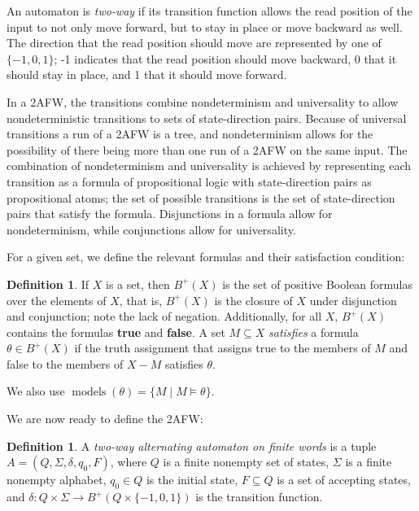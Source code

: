 \documentclass{lmcs}
\theoremstyle{definition}
\newtheorem{definition}[thm]{Definition}
\DeclareMathOperator{\?}{?}
\DeclareMathOperator{\mymodels}{models}
\begin{document}
An automaton is \textit{two-way} if its transition function allows the read position of the
input to not only move forward, but to stay in place or move backward as well. The direction
that the read position should move are represented by one of $\{-1,0,1\}$; -1 indicates
that the read position should move backward, 0 that it should stay in place, and 1 that it
should move forward.

In a 2AFW, the transitions combine nondeterminism and universality to allow nondeterministic
transitions to sets of state-direction pairs. Because of universal transitions a run of a 2AFW
is a tree, and nondeterminism allows for the possibility of there being more than one run of
a 2AFW on the same input. The combination of nondeterminism and universality is achieved by
representing each transition as a formula of propositional logic with state-direction pairs
as propositional atoms; the set of possible transitions is the set of state-direction pairs that
satisfy the formula. Disjunctions in a formula allow for nondeterminism, while conjunctions
allow for universality.



For a given set, we define the relevant formulas and their satisfaction condition:

    \begin{definition}\label{def:positive_boolean}
If $X$ is a set, then $B^+(X)$ is the set of positive Boolean formulas over the elements of
    $X$, that is, $B^+(X)$ is the closure of $X$ under disjunction and conjunction; note
    the lack of negation. Additionally, for all $X$, $B^+(X)$ contains the formulas
    \textbf{true} and \textbf{false}.  A set
$M \subseteq X$ \textit{satisfies} a formula $\theta \in B^+(X)$ if the truth
assignment that assigns true to the members of $M$ and false to the members of
$X - M$ satisfies $\theta$.
\end{definition}
We also use $\mymodels(\theta) = \{M \mid M \models \theta \}$.

We are now ready to define the 2AFW:

    \begin{definition}\label{def:2afw_simple}
A \textit{two-way alternating automaton on finite words} is a tuple $A = (Q, \Sigma, \delta, \allowbreak q_0,
F)$, where $Q$ is a finite nonempty set of states, $\Sigma$ is a finite nonempty alphabet, $q_0
\in Q$ is the initial state, $F \subseteq Q$ is a set of accepting states, and $\delta :
Q \times \Sigma \rightarrow B^+(Q \times \{-1, 0, 1\})$ is the transition function.
    \end{definition}
\end{document}
